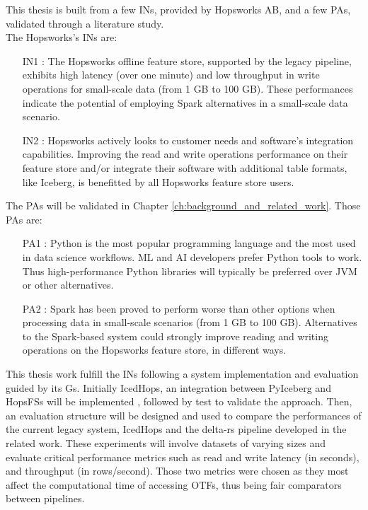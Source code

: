 This thesis is built from a few \glspl{IN}, provided by Hopsworks AB, and a few \glspl{PA}, validated through a literature study. \\ The Hopsworks's \glspl{IN} are:
\begin{itemize}
    \item[IN1 :] The Hopsworks offline feature store, supported by the legacy pipeline, exhibits high latency (over one minute) and low throughput in write operations for small-scale data (from 1 GB to 100 GB). These performances indicate the potential of employing Spark alternatives in a small-scale data scenario.
    \item[IN2 :] Hopsworks actively looks to customer needs and software's integration capabilities. Improving the read and write operations performance on their feature store and/or integrate their software with additional table formats, like Iceberg, is benefitted by all Hopsworks feature store users.
\end{itemize}
The \glspl{PA} will be validated in Chapter \ref{ch:background_and_related_work}. Those \glspl{PA} are: 
\begin{itemize}
    \item[PA1 :] Python is the most popular programming language and the most used in data science workflows. \gls{ML} and \gls{AI} developers prefer Python tools to work. Thus high-performance Python libraries will typically be preferred over \gls{JVM} or other alternatives.
    \item[PA2 :] Spark has been proved to perform worse than other options when processing data in small-scale scenarios (from 1 GB to 100 GB). Alternatives to the Spark-based system could strongly improve reading and writing operations on the Hopsworks feature store, in different ways.
\end{itemize}

This thesis work fulfill the \glspl{IN} following a system implementation and evaluation guided by its \glspl{G}. Initially IcedHops, an integration between PyIceberg and \glspl{HopsFS} will be implemented \cite{niaziHopsFSScalingHierarchical2017}, followed by test to validate the approach. Then, an evaluation structure will be designed and used to compare the performances of the current legacy system, IcedHops and the delta-rs pipeline developed in the related work. These experiments will involve datasets of varying sizes and evaluate critical performance metrics such as read and write latency (in seconds), and throughput (in rows/second). Those two metrics were chosen as they most affect the computational time of accessing \glspl{OTF}, thus being fair comparators between pipelines.